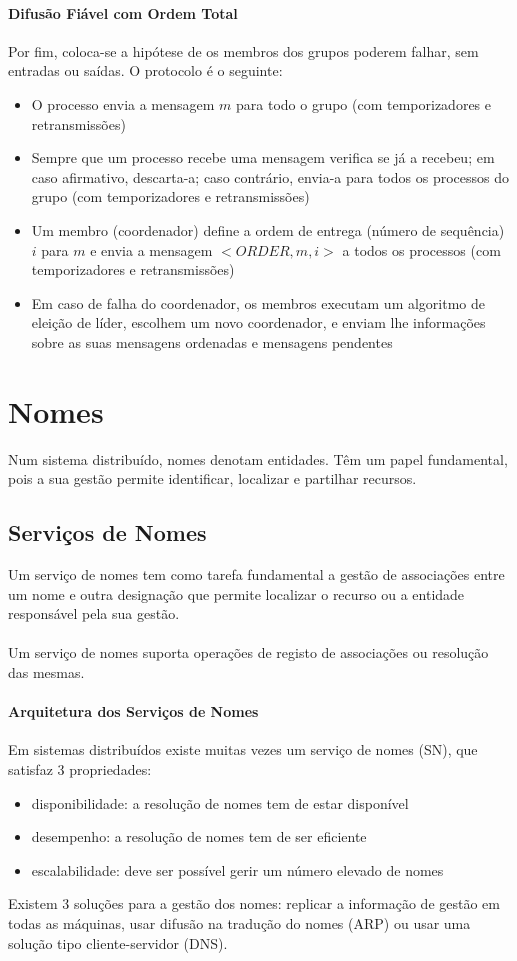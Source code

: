 \documentclass[10pt,a4paper]{report}
\begin{document}
\subsubsection{Difusão Fiável com Ordem Total}
Por fim, coloca-se a hipótese de os membros dos grupos poderem falhar, sem entradas ou saídas. O protocolo é o seguinte:
\begin{itemize}
\item O processo envia a mensagem $m$ para todo o grupo (com temporizadores e retransmissões)
\item Sempre que um processo recebe uma mensagem verifica se já a recebeu; em caso afirmativo, descarta-a; caso contrário, envia-a para todos os processos do grupo (com temporizadores e retransmissões)
\item Um membro (coordenador) define a ordem de entrega (número de sequência)
$i$ para $m$ e envia a mensagem $<ORDER,m,i>$ a todos os processos (com
temporizadores e retransmissões)
\item Em caso de falha do coordenador, os membros executam um algoritmo de
eleição de líder, escolhem um novo coordenador, e enviam lhe informações
sobre as suas mensagens ordenadas e mensagens pendentes
\end{itemize}

\chapter{Nomes}
Num sistema distribuído, nomes denotam entidades. Têm um papel fundamental, pois a sua gestão permite identificar, localizar e partilhar recursos.
\section{Serviços de Nomes}
Um serviço de nomes tem como tarefa fundamental a gestão de associações entre um nome e outra designação que permite localizar o recurso ou a entidade responsável pela sua gestão.\\
\\
Um serviço de nomes suporta operações de registo de associações ou resolução das mesmas.
\subsubsection{Arquitetura dos Serviços de Nomes}
Em sistemas distribuídos existe muitas vezes um serviço de nomes (SN), que satisfaz 3 propriedades:
\begin{itemize}
\item disponibilidade: a resolução de nomes tem de estar disponível
\item desempenho: a resolução de nomes tem de ser eficiente
\item escalabilidade: deve ser possível gerir um número elevado de nomes
\end{itemize}
Existem 3 soluções para a gestão dos nomes: replicar a informação de gestão em todas as máquinas, usar difusão na tradução do nomes (ARP) ou usar uma solução tipo cliente-servidor (DNS).
\end{document}
